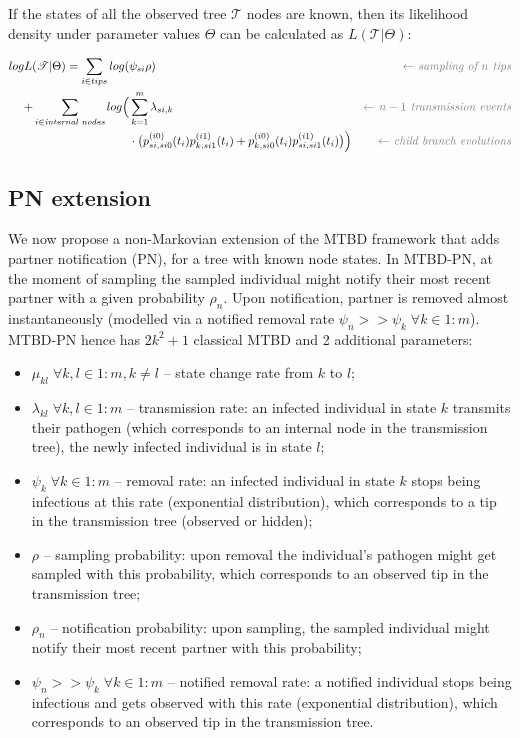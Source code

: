 \documentclass[a4paper,10pt]{article}
\begin{document}
If the states of all the observed tree $\mathscr{T}$ nodes are known, then its likelihood density under parameter values $\Theta$ can be calculated as $L(\mathscr{T}|\Theta)$:

{\scriptsize
\begin{alignat*}{3}
log L(\mathscr{T}|\Theta) =  \sum\limits_{i \in tips}  log(&\psi_{si}  \rho) & \textit{\color{gray} $\leftarrow$ sampling of $n$ tips} \\
 +\sum\limits_{i \in \textit{internal nodes}} log \Big(&\sum\limits_{k=1}^{m} \lambda_{si,k}  & \textit{\color{gray} $\leftarrow$ $n - 1$ transmission events}\\
 & \cdot \big(p_{si,si0}^{(i0)}(t_i)p_{k,si1}^{(i1)}(t_i) + p_{k,si0}^{(i0)}(t_i)p_{si,si1}^{(i1)}(t_i)\big)\Big) & \textit{\color{gray}$\leftarrow$ child branch evolutions}  \label{eq:mtbd_tree_likelihood}
\end{alignat*}}


\subsection{PN extension}

We now propose a non-Markovian extension of the MTBD framework that adds partner notification (PN), for a tree with known node states.  In MTBD-PN, at the moment of sampling the sampled individual might notify their most recent partner with a given probability $\rho_n$. Upon notification, partner is removed almost instantaneously (modelled via a notified removal rate $\psi_n >> \psi_k \;\forall k \in 1:m$). MTBD-PN hence has $2k^2 + 1$ classical MTBD and 2 additional parameters:
\begin{itemize}
 \item $\mu_{kl} \;\forall k,l \in 1:m, k \neq l$ -- state change rate from $k$ to $l$;
 \item $\lambda_{kl} \;\forall k,l \in 1:m$ -- transmission rate: an infected individual in state $k$ transmits their pathogen (which corresponds to an internal node in the transmission tree), the newly infected individual is in state $l$;
 \item $\psi_k \;\forall k \in 1:m$ -- removal rate: an infected individual in state $k$ stops being infectious at this rate (exponential distribution), which corresponds to a tip in the transmission tree (observed or hidden);
 \item $\rho$ -- sampling probability: upon removal the individual's pathogen might get sampled with this probability, which corresponds to an observed tip in the transmission tree;
 \item $\rho_n$ -- notification probability: upon sampling, the sampled individual might notify their most recent partner with this probability;
 \item $\psi_n >> \psi_k  \;\forall k \in 1:m$ -- notified removal rate: a notified individual stops being infectious and gets observed with this rate (exponential distribution), which corresponds to an observed tip in the transmission tree.
\end{itemize}
\end{document}
